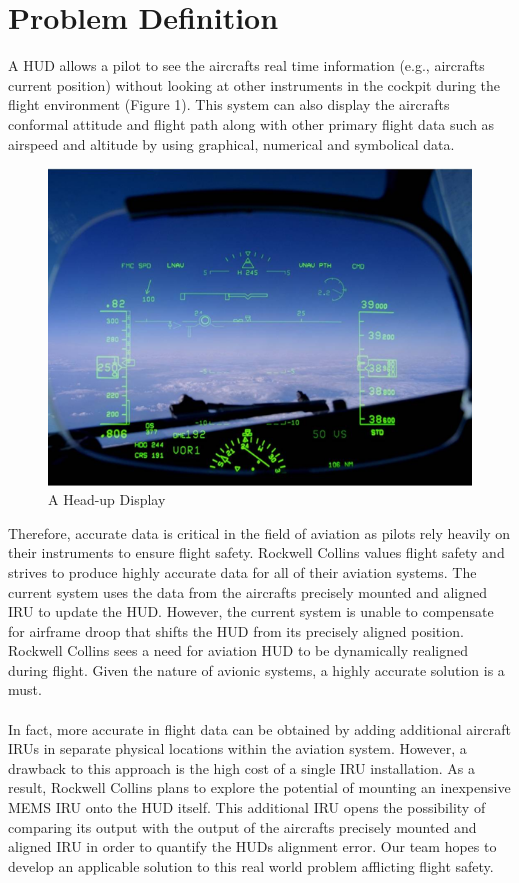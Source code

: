 \documentclass[letterpaper,10pt,notitlepage]{article}
\begin{document}
\section*{Problem Definition}
A HUD allows a pilot to see the aircraft\textquotesingle s real time information (e.g., aircraft\textquotesingle s current position) without looking at other instruments in the cockpit during the flight environment (Figure 1). This system can also display the aircraft\textquotesingle s conformal attitude and flight path along with other primary flight data such as airspeed and altitude by using graphical, numerical and symbolical data.

\begin{figure}[!ht]
  \centering
      \includegraphics{hud}
  \caption{A Head-up Display \cite{hud_figure}}
\end{figure}

\noindent
Therefore, accurate data is critical in the field of aviation as pilots rely heavily on their instruments to ensure flight safety. Rockwell Collins values flight safety and strives to produce highly accurate data for all of their aviation systems. The current system uses the data from the aircraft\textquotesingle s precisely mounted and aligned IRU to update the HUD. However, the current system is unable to compensate for airframe droop that shifts the HUD from its precisely aligned position. Rockwell Collins sees a need for aviation HUD to be dynamically realigned during flight. Given the nature of avionic systems, a highly accurate solution is a must.\\\\
In fact, more accurate in flight data can be obtained by adding additional aircraft IRUs in separate physical locations within the aviation system. However, a drawback to this approach is the high cost of a single IRU installation. As a result, Rockwell Collins plans to explore the potential of mounting an inexpensive MEMS IRU onto the HUD itself. This additional IRU opens the possibility of comparing its output with the output of the aircraft\textquotesingle s precisely mounted and aligned IRU in order to quantify the HUDs alignment error. Our team hopes to develop an applicable solution to this real world problem afflicting flight safety.
\end{document}
